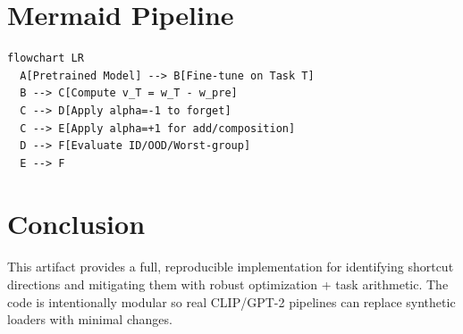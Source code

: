 \documentclass[11pt]{article}
\begin{document}
\section{Mermaid Pipeline}
\begin{lstlisting}
flowchart LR
  A[Pretrained Model] --> B[Fine-tune on Task T]
  B --> C[Compute v_T = w_T - w_pre]
  C --> D[Apply alpha=-1 to forget]
  C --> E[Apply alpha=+1 for add/composition]
  D --> F[Evaluate ID/OOD/Worst-group]
  E --> F
\end{lstlisting}

\section{Conclusion}
This artifact provides a full, reproducible implementation for identifying shortcut directions and mitigating them with robust optimization + task arithmetic. The code is intentionally modular so real CLIP/GPT-2 pipelines can replace synthetic loaders with minimal changes.



\end{document}
